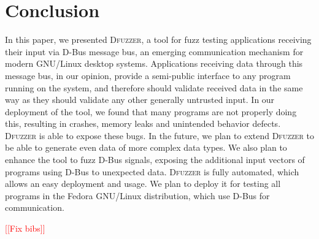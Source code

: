 \documentclass[conference]{IEEEtran}
\newcommand{\addtodo}[1]{\textcolor{red}{[[#1]]}}
\begin{document}
\section{Conclusion}
In this paper, we presented \textsc{Dfuzzer}, a tool for fuzz testing
applications receiving their input via D-Bus message bus, an emerging
communication mechanism for modern GNU/Linux desktop systems. Applications
receiving data through this message bus, in our opinion, provide a semi-public
interface to any program running on the system, and therefore should validate
received data in the same way as they should validate any other generally
untrusted input. In our deployment of the tool, we found that many programs are
not properly doing this, resulting in crashes, memory leaks and unintended
behavior defects. \textsc{Dfuzzer} is able to expose these bugs.  In the
future, we plan to extend \textsc{Dfuzzer} to be able to generate even data of
more complex data types. We also plan to enhance the tool to fuzz D-Bus
signals, exposing the additional input vectors of programs using D-Bus to
unexpected data.  \textsc{Dfuzzer} is fully automated, which allows an easy
deployment and usage.  We plan to deploy it for testing all programs in the
Fedora GNU/Linux distribution, which use D-Bus for communication.

\addtodo{Fix bibs}



\end{document}
